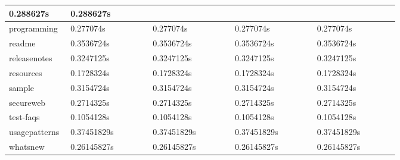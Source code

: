 \documentclass[letterpaper,10pt,titlepage]{article}
\begin{document}
\begin{longtable}{ | p{0.15\linewidth} | p{0.2\linewidth} | p{0.2\linewidth} | p{0.2\linewidth} | p{0.2\linewidth} |}
    0.288627s &
    0.288627s \\
    \hline
    programming &
    0.277074s &
    0.277074s &
    0.277074s &
    0.277074s \\
    \hline
    readme &
    0.3536724s &
    0.3536724s &
    0.3536724s &
    0.3536724s \\
    \hline
    releasenotes &
    0.3247125s &
    0.3247125s &
    0.3247125s &
    0.3247125s \\
    \hline
    resources &
    0.1728324s &
    0.1728324s &
    0.1728324s &
    0.1728324s \\
    \hline
    sample &
    0.3154724s &
    0.3154724s &
    0.3154724s &
    0.3154724s \\
    \hline
    secureweb &
    0.2714325s &
    0.2714325s &
    0.2714325s &
    0.2714325s \\
    \hline
    test-faqs &
    0.1054128s &
    0.1054128s &
    0.1054128s &
    0.1054128s \\
    \hline
    usagepatterns &
    0.37451829s &
    0.37451829s &
    0.37451829s &
    0.37451829s \\
    \hline
    whatsnew &
    0.26145827s &
    0.26145827s &
    0.26145827s &
    0.26145827s \\
    \hline
\end{longtable}
\end{document}
